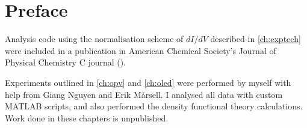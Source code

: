 
\chapter{Preface}

Analysis code using the normalisation scheme of $dI/dV$ described in \autoref{ch:exptech} were included in a publication in American Chemical Society's Journal of Physical Chemistry C journal (\citealt{cochrane2018molecularly}).

Experiments outlined in \autoref{ch:opv} and \autoref{ch:oled} were performed by myself with help from Giang Nguyen and Erik M\aa rsell. I analysed all data with custom MATLAB scripts, and also performed the density functional theory calculations. Work done in these chapters is unpublished.
